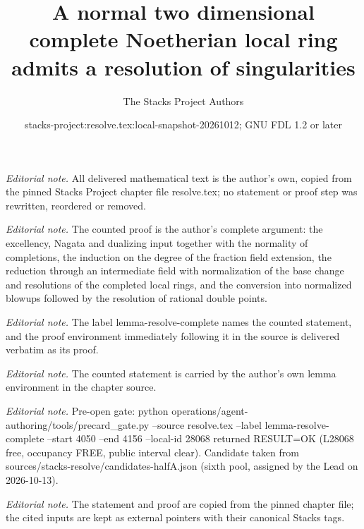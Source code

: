 \documentclass[10pt,a4paper]{amsart}
\title{A normal two dimensional complete Noetherian local ring admits a resolution of singularities}
\author{The Stacks Project Authors}
\date{stacks-project:resolve.tex:local-snapshot-20261012; GNU FDL 1.2 or later}
\theoremstyle{plain}
\theoremstyle{definition}
\theoremstyle{remark}
\numberwithin{equation}{subsection}
\begin{document}
\maketitle
\noindent\textit{Editorial note.} All delivered mathematical text is the author's own, copied from the pinned Stacks Project chapter file resolve.tex; no statement or proof step was rewritten, reordered or removed.\par\medskip
\noindent\textit{Editorial note.} The counted proof is the author's complete argument: the excellency, Nagata and dualizing input together with the normality of completions, the induction on the degree of the fraction field extension, the reduction through an intermediate field with normalization of the base change and resolutions of the completed local rings, and the conversion into normalized blowups followed by the resolution of rational double points.\par\medskip
\noindent\textit{Editorial note.} The label lemma-resolve-complete names the counted statement, and the proof environment immediately following it in the source is delivered verbatim as its proof.\par\medskip
\noindent\textit{Editorial note.} The counted statement is carried by the author's own lemma environment in the chapter source.\par\medskip
\noindent\textit{Editorial note.} Pre-open gate: python operations/agent-authoring/tools/precard\_gate.py --source resolve.tex --label lemma-resolve-complete --start 4050 --end 4156 --local-id 28068 returned RESULT=OK (L28068 free, occupancy FREE, public interval clear). Candidate taken from sources/stacks-resolve/candidates-halfA.json (sixth pool, assigned by the Lead on 2026-10-13).\par\medskip
\noindent\textit{Editorial note.} The statement and proof are copied from the pinned chapter file; the cited inputs are kept as external pointers with their canonical Stacks tags.\par\medskip
\end{document}
